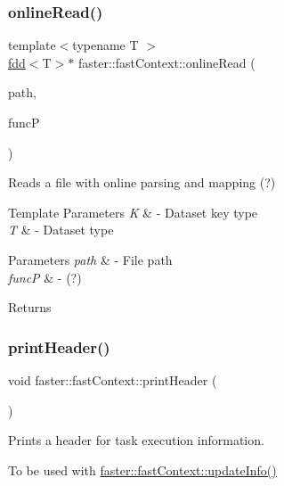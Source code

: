 \subsubsection{\texorpdfstring{online\+Read()}{onlineRead()}}
{\footnotesize\ttfamily template$<$typename T $>$ \\
\hyperlink{classfaster_1_1fdd}{fdd}$<$T$>$$\ast$ faster\+::fast\+Context\+::online\+Read (\begin{DoxyParamCaption}\item[{std\+::string}]{path,  }\item[{online\+Full\+Part\+FuncP$<$ T $>$}]{funcP }\end{DoxyParamCaption})}



Reads a file with online parsing and mapping (?) 


\begin{DoxyTemplParams}{Template Parameters}
{\em K} & -\/ Dataset key type \\
\hline
{\em T} & -\/ Dataset type \\
\hline
\end{DoxyTemplParams}

\begin{DoxyParams}{Parameters}
{\em path} & -\/ File path \\
\hline
{\em funcP} & -\/ (?)\\
\hline
\end{DoxyParams}
\begin{DoxyReturn}{Returns}

\end{DoxyReturn}
\hypertarget{classfaster_1_1fastContext_a721a0db53e603bff27578e040b616f6f}{}\label{classfaster_1_1fastContext_a721a0db53e603bff27578e040b616f6f} 
\subsubsection{\texorpdfstring{print\+Header()}{printHeader()}}
{\footnotesize\ttfamily void faster\+::fast\+Context\+::print\+Header (\begin{DoxyParamCaption}{ }\end{DoxyParamCaption})}



Prints a header for task execution information. 

To be used with \hyperlink{classfaster_1_1fastContext_ae6e69c86414bc5333da72aef13257d26}{faster\+::fast\+Context\+::update\+Info()} 


